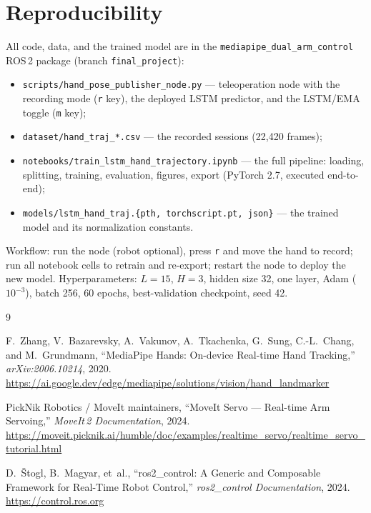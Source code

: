 \documentclass[11pt,a4paper]{article}
\begin{document}
\appendix
\section{Reproducibility}

All code, data, and the trained model are in the
\texttt{mediapipe\_dual\_arm\_control} ROS\,2 package
(branch \texttt{final\_project}):
\begin{itemize}
  \item \texttt{scripts/hand\_pose\_publisher\_node.py} --- teleoperation node
        with the recording mode (\texttt{r} key), the deployed LSTM predictor,
        and the LSTM/EMA toggle (\texttt{m} key);
  \item \texttt{dataset/hand\_traj\_*.csv} --- the recorded sessions
        (22{,}420 frames);
  \item \texttt{notebooks/train\_lstm\_hand\_trajectory.ipynb} --- the full
        pipeline: loading, splitting, training, evaluation, figures, export
        (PyTorch 2.7, executed end-to-end);
  \item \texttt{models/lstm\_hand\_traj.\{pth, torchscript.pt, json\}} --- the
        trained model and its normalization constants.
\end{itemize}
Workflow: run the node (robot optional), press \texttt{r} and move the hand to
record; run all notebook cells to retrain and re-export; restart the node to
deploy the new model. Hyperparameters: $L{=}15$, $H{=}3$, hidden size 32, one
layer, Adam ($10^{-3}$), batch 256, 60 epochs, best-validation checkpoint,
seed 42.

\begin{thebibliography}{9}

F.~Zhang, V.~Bazarevsky, A.~Vakunov, A.~Tkachenka, G.~Sung, C.-L.~Chang, and
M.~Grundmann, ``MediaPipe Hands: On-device Real-time Hand Tracking,''
\emph{arXiv:2006.10214}, 2020.
\url{https://ai.google.dev/edge/mediapipe/solutions/vision/hand_landmarker}

PickNik Robotics / MoveIt maintainers, ``MoveIt Servo --- Real-time Arm
Servoing,'' \emph{MoveIt\,2 Documentation}, 2024.
\url{https://moveit.picknik.ai/humble/doc/examples/realtime_servo/realtime_servo_tutorial.html}

D.~\v{S}togl, B.~Magyar, et~al., ``ros2\_control: A Generic and Composable
Framework for Real-Time Robot Control,'' \emph{ros2\_control Documentation},
2024. \url{https://control.ros.org}

\end{thebibliography}
\end{document}
